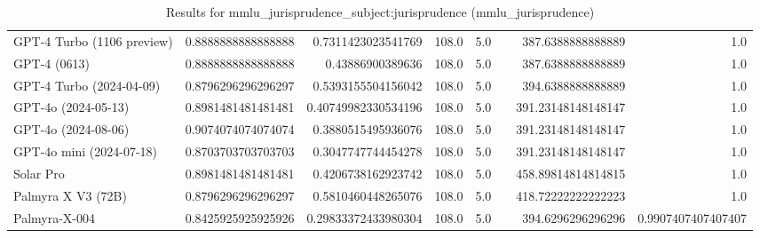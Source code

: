 \begin{table}[htp]
{\begin{tabular}{lrrrrrrr}
GPT-4 Turbo (1106 preview) & 0.8888888888888888 & 0.7311423023541769 & 108.0 & 5.0 &  & 387.6388888888889 & 1.0 \\
GPT-4 (0613) & 0.8888888888888888 & 0.43886900389636 & 108.0 & 5.0 &  & 387.6388888888889 & 1.0 \\
GPT-4 Turbo (2024-04-09) & 0.8796296296296297 & 0.5393155504156042 & 108.0 & 5.0 &  & 394.6388888888889 & 1.0 \\
GPT-4o (2024-05-13) & 0.8981481481481481 & 0.40749982330534196 & 108.0 & 5.0 &  & 391.23148148148147 & 1.0 \\
GPT-4o (2024-08-06) & 0.9074074074074074 & 0.3880515495936076 & 108.0 & 5.0 &  & 391.23148148148147 & 1.0 \\
GPT-4o mini (2024-07-18) & 0.8703703703703703 & 0.3047747744454278 & 108.0 & 5.0 &  & 391.23148148148147 & 1.0 \\
Solar Pro & 0.8981481481481481 & 0.4206738162923742 & 108.0 & 5.0 &  & 458.89814814814815 & 1.0 \\
Palmyra X V3 (72B) & 0.8796296296296297 & 0.5810460448265076 & 108.0 & 5.0 &  & 418.72222222222223 & 1.0 \\
Palmyra-X-004 & 0.8425925925925926 & 0.29833372433980304 & 108.0 & 5.0 &  & 394.6296296296296 & 0.9907407407407407 \\
\bottomrule
\end{tabular}}
\caption{Results for mmlu_jurisprudence_subject:jurisprudence (mmlu_jurisprudence)}
\label{fig:mmlu_jurisprudence_subject:jurisprudence (mmlu_jurisprudence)}
\end{table}